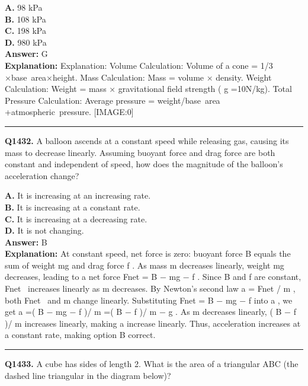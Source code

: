 \documentclass[12pt]{article}
\begin{document}
\textbf{A.} 98 kPa \\
\textbf{B.} 108 kPa \\
\textbf{C.} 198 kPa \\
\textbf{D.} 980 kPa \\

\textbf{Answer:} G \\
\textbf{Explanation:} Explanation:
Volume Calculation: Volume of a cone = 1/3
​
×base area×height.
Mass Calculation: Mass = volume × density.
Weight Calculation: Weight = mass × gravitational field strength (
g
=10N/kg).
Total Pressure Calculation: Average pressure = weight/base area
​
+atmospheric pressure.
[IMAGE:0]

\hrule
\vspace{1em}


\noindent
\textbf{Q1432.} A balloon ascends at a constant speed while releasing gas, causing its mass to decrease linearly. Assuming buoyant force and drag force are both constant and independent of speed, how does the magnitude of the balloon’s acceleration change?



\textbf{A.} It is increasing at an increasing rate. \\
\textbf{B.} It is increasing at a constant rate. \\
\textbf{C.} It is increasing at a decreasing rate. \\
\textbf{D.} It is not changing. \\

\textbf{Answer:} B \\
\textbf{Explanation:} At constant speed, net force is zero: buoyant force
B
equals the sum of weight
mg
and drag force
f
. As mass
m
decreases linearly, weight
mg
decreases, leading to a net force
Fnet
​=
B
−
mg
−
f
. Since
B
and
f
are constant,
Fnet
​ increases linearly as
m
decreases. By Newton’s second law
a
=
Fnet
​/
m
, both
Fnet
​ and
m
change linearly. Substituting
Fnet
​=
B
−
mg
−
f
into
a
, we get
a
=(
B
−
mg
−
f
)/
m
=(
B
−
f
)/
m
−
g
. As
m
decreases linearly, (
B
−
f
)/
m
increases linearly, making
a
increase linearly. Thus, acceleration increases at a constant rate, making option B correct.

\hrule
\vspace{1em}


\noindent
\textbf{Q1433.} A cube has sides of length 2. What is the area of a triangular ABC (the dashed line triangular in the diagram below)?
\end{document}
